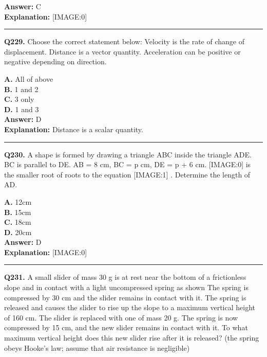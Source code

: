 \documentclass[12pt]{article}
\begin{document}
\textbf{Answer:} C \\
\textbf{Explanation:} [IMAGE:0]

\hrule
\vspace{1em}


\noindent
\textbf{Q229.} Choose the correct statement below:
Velocity is the rate of change of displacement.
Distance is a vector quantity.
Acceleration can be positive or negative depending on direction.



\textbf{A.} All of above \\
\textbf{B.} 1 and 2 \\
\textbf{C.} 3 only \\
\textbf{D.} 1 and 3 \\

\textbf{Answer:} D \\
\textbf{Explanation:} Distance is a scalar quantity.

\hrule
\vspace{1em}


\noindent
\textbf{Q230.} A shape is formed by drawing a triangle ABC inside the triangle ADE. BC is parallel to DE. AB = 8 cm, BC = p cm, DE = p + 6 cm.
[IMAGE:0]
is the smaller root of roots to the equation
[IMAGE:1]
.
Determine the length of AD.



\textbf{A.} 12cm \\
\textbf{B.} 15cm \\
\textbf{C.} 18cm \\
\textbf{D.} 20cm \\

\textbf{Answer:} D \\
\textbf{Explanation:} [IMAGE:0]

\hrule
\vspace{1em}


\noindent
\textbf{Q231.} A small slider of mass 30 g is at rest near the bottom of a frictionless slope and in contact with a light uncompressed spring as shown
The spring is compressed by 30 cm and the slider remains in contact with it.
The spring is released and causes the slider to rise up the slope to a maximum vertical height of 160 cm.
The slider is replaced with one of mass 20 g.
The spring is now compressed by 15 cm, and the new slider remains in contact with it. To what maximum vertical height does this new slider rise after it is released?
(the spring obeys Hooke’s law; assume that air resistance is negligible)
\end{document}
